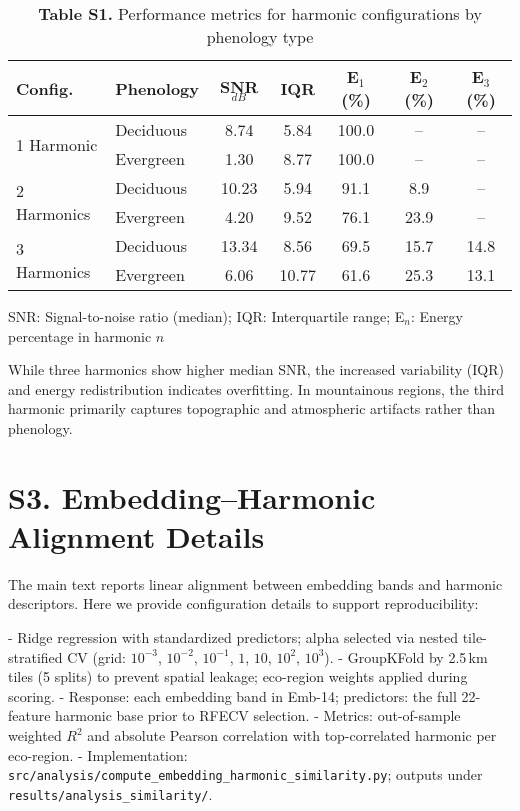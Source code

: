 \documentclass[utf8]{frontiers_suppmat}
\begin{document}
\begin{table}[H]
    \centering
    \caption{\textbf{Table S1.} Performance metrics for harmonic configurations by phenology type}
    \begin{tabular}{llccccc}
        \hline
        \textbf{Config.} & \textbf{Phenology} & \textbf{SNR$_{dB}$} & \textbf{IQR} & \textbf{E$_1$ (\%)} & \textbf{E$_2$ (\%)} & \textbf{E$_3$ (\%)} \\
        \hline
        \multirow{2}{*}{1 Harmonic}
            & Deciduous & 8.74 & 5.84 & 100.0 & -- & -- \\
            & Evergreen & 1.30 & 8.77 & 100.0 & -- & -- \\
        \hline
        \multirow{2}{*}{2 Harmonics}
            & Deciduous & 10.23 & 5.94 & 91.1 & 8.9 & -- \\
            & Evergreen & 4.20 & 9.52 & 76.1 & 23.9 & -- \\
        \hline
        \multirow{2}{*}{3 Harmonics}
            & Deciduous & 13.34 & 8.56 & 69.5 & 15.7 & 14.8 \\
            & Evergreen & 6.06 & 10.77 & 61.6 & 25.3 & 13.1 \\
        \hline
    \end{tabular}
    \label{tab:harmonic_metrics}
    \vspace{2mm}
    \small{SNR: Signal-to-noise ratio (median); IQR: Interquartile range; E$_n$: Energy percentage in harmonic $n$}
\end{table}

While three harmonics show higher median SNR, the increased variability (IQR) and energy redistribution indicates overfitting. In mountainous regions, the third harmonic primarily captures topographic and atmospheric artifacts rather than phenology.

\section{S3. Embedding–Harmonic Alignment Details}

The main text reports linear alignment between embedding bands and harmonic descriptors. Here we provide configuration details to support reproducibility:

- Ridge regression with standardized predictors; alpha selected via nested tile-stratified CV (grid: $10^{-3}$, $10^{-2}$, $10^{-1}$, $1$, $10$, $10^2$, $10^3$).
- GroupKFold by 2.5\,km tiles (5 splits) to prevent spatial leakage; eco-region weights applied during scoring.
- Response: each embedding band in Emb-14; predictors: the full 22-feature harmonic base prior to RFECV selection.
- Metrics: out-of-sample weighted $R^2$ and absolute Pearson correlation with top-correlated harmonic per eco-region.
- Implementation: \texttt{src/analysis/compute\_embedding\_harmonic\_similarity.py}; outputs under \texttt{results/analysis\_similarity/}.
\end{document}
